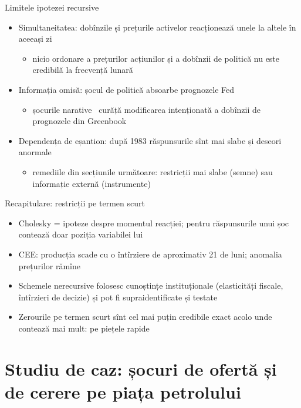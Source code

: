 \begin{frame}{Limitele ipotezei recursive}
\itemsize{\small}
\begin{itemize}
    \item Simultaneitatea: dobînzile și prețurile activelor reacționează unele la altele în aceeași zi
    \begin{itemize}
        \item nicio ordonare a prețurilor acțiunilor și a dobînzii de politică nu este credibilă la frecvență lunară
    \end{itemize}
    \item Informația omisă: șocul de politică absoarbe prognozele Fed
    \begin{itemize}
        \item șocurile narative \ curăță modificarea intenționată a dobînzii de prognozele din Greenbook
    \end{itemize}
    \item Dependența de eșantion: după 1983 răspunsurile sînt mai slabe și deseori anormale 
    \begin{itemize}
        \item remediile din secțiunile următoare: restricții mai slabe (semne) sau informație externă (instrumente)
    \end{itemize}
\end{itemize}
\end{frame}

\begin{frame}{Recapitulare: restricții pe termen scurt}
\itemsize{\small}
\begin{itemize}
    \item Cholesky = ipoteze despre momentul reacției; pentru răspunsurile unui șoc contează doar poziția variabilei lui
    \item CEE: producția scade cu o întîrziere de aproximativ 21 de luni; anomalia prețurilor rămîne
    \item Schemele nerecursive folosesc cunoștințe instituționale (elasticități fiscale, întîrzieri de decizie) și pot fi supraidentificate și testate
    \item Zerourile pe termen scurt sînt cel mai puțin credibile exact acolo unde contează mai mult: pe piețele rapide
\end{itemize}
\end{frame}


\section{Studiu de caz: șocuri de ofertă și de cerere pe piața petrolului}

